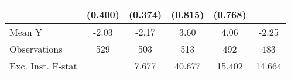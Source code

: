 {\begin{tabular}{l*{5}{c}}
            &     (0.400)         &     (0.374)         &     (0.815)         &     (0.768)         &                     \\
\midrule
Mean Y      &       -2.03         &       -2.17         &        3.60         &        4.06         &       -2.25         \\
Observations&         529         &         503         &         513         &         492         &         483         \\
Exc. Inst. F-stat&                     &       7.677         &      40.677         &      15.402         &      14.664         \\
\bottomrule
\end{tabular}
}
